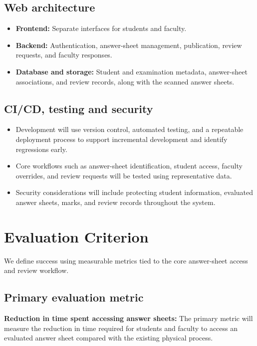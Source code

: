 \documentclass[11pt,a4paper]{article}
\begin{document}
\subsection{Web architecture}
\begin{itemize}[leftmargin=0.7cm]
    \item \textbf{Frontend:} Separate interfaces for students and faculty.
    \item \textbf{Backend:} Authentication, answer-sheet management, publication, review requests, and faculty responses.
    \item \textbf{Database and storage:} Student and examination metadata, answer-sheet associations, and review records, along with the scanned answer sheets.
\end{itemize}

\subsection{CI/CD, testing and security}
\begin{itemize}[leftmargin=0.7cm]
    \item Development will use version control, automated testing, and a repeatable deployment process to support incremental development and identify regressions early.
    \item Core workflows such as answer-sheet identification, student access, faculty overrides, and review requests will be tested using representative data.
    \item Security considerations will include protecting student information, evaluated answer sheets, marks, and review records throughout the system.
\end{itemize}

\section{Evaluation Criterion}
We define success using measurable metrics tied to the core answer-sheet access and review workflow.

\subsection{Primary evaluation metric}
\textbf{Reduction in time spent accessing answer sheets:} The primary metric will measure the reduction in time required for students and faculty to access an evaluated answer sheet compared with the existing physical process.
\end{document}
